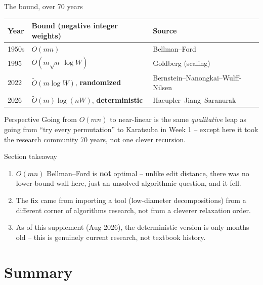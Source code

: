 \documentclass[11pt,aspectratio=169]{beamer}
\begin{document}
\begin{frame}{The bound, over 70 years}
  \small
  \begin{center}
  \begin{tabular}{@{}lll@{}}
    \toprule
    Year & Bound (negative integer weights) & Source \\
    \midrule
    1950s & $O(mn)$ & Bellman--Ford \\
    1995 & $O(m\sqrt{n}\,\log W)$ & Goldberg (scaling) \\
    2022 & $\widetilde{O}(m\log W)$, \textbf{randomized} & Bernstein--Nanongkai--Wulff-Nilsen \\
    2026 & $\widetilde{O}(m)\log(nW)$, \textbf{deterministic} & Haeupler--Jiang--Saranurak \\
    \bottomrule
  \end{tabular}
  \end{center}
  \begin{exampleblock}{Perspective}
    Going from $O(mn)$ to near-linear is the same \emph{qualitative} leap as going from
    ``try every permutation'' to Karatsuba in Week 1 -- except here it took the research
    community 70 years, not one clever recursion.
  \end{exampleblock}
\end{frame}

\begin{frame}{Section takeaway}
  \begin{enumerate}
    \item $O(mn)$ Bellman--Ford is \textbf{not} optimal -- unlike edit distance, there
    was no lower-bound wall here, just an unsolved algorithmic question, and it fell.
    \item The fix came from importing a tool (low-diameter decompositions) from a
    different corner of algorithms research, not from a cleverer relaxation order.
    \item As of this supplement (Aug 2026), the deterministic version is only months
    old -- this is genuinely current research, not textbook history.
  \end{enumerate}
\end{frame}

\section{Summary}
\end{document}
